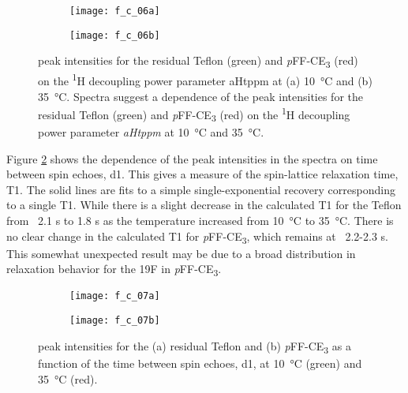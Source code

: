 \begin{figure}
    \centering
    \begin{subfigure}[b]{0.4\textwidth}
        \texttt{[image: f\_c\_06a]}
    \end{subfigure}
    \begin{subfigure}[b]{0.4\textwidth}
        \texttt{[image: f\_c\_06b]}
    \end{subfigure}
    \caption{ peak intensities for the residual Teflon (green) and
    \emph{p}FF-CE\textsubscript{3} (red) on the \textsuperscript{1}H decoupling
    power parameter aHtppm at (a) \SI{10}{\celsius} and (b)
    \SI{35}{\celsius}.  Spectra suggest a dependence of the peak intensities for
    the residual Teflon (green) and \emph{p}FF-CE\textsubscript{3} (red) on the
    \textsuperscript{1}H decoupling power parameter \emph{aHtppm} at
    \SI{10}{\celsius} and \SI{35}{\celsius}.}\label{fig:nmr_result_2}
\end{figure}

Figure \ref{fig:nmr_result_3} shows the dependence of the peak intensities in
the  spectra on time between spin echoes, d1.  This gives a measure
of the spin-lattice relaxation time, T1.  The solid lines are fits to a simple
single-exponential recovery corresponding to a single T1.  While there is a
slight decrease in the calculated T1 for the Teflon from ~2.1 s to 1.8 s as the
temperature increased from \SI{10}{\celsius} to \SI{35}{\celsius}.  There is no
clear change in the calculated T1 for \emph{p}FF-CE\textsubscript{3}, which
remains at ~2.2-2.3 s.  This somewhat unexpected result may be due to a broad
distribution in relaxation behavior for the 19F in
\emph{p}FF-CE\textsubscript{3}.
\begin{figure}
    \centering
    \begin{subfigure}[b]{0.4\textwidth}
        \texttt{[image: f\_c\_07a]}
    \end{subfigure}
    \begin{subfigure}[b]{0.4\textwidth}
        \texttt{[image: f\_c\_07b]}
    \end{subfigure}
    \caption{ peak intensities for the (a) residual Teflon and (b)
    \emph{p}FF-CE\textsubscript{3} as a function of the time between spin
    echoes, d1, at \SI{10}{\celsius} (green) and \SI{35}{\celsius} (red).}
    \label{fig:nmr_result_3}
\end{figure}


